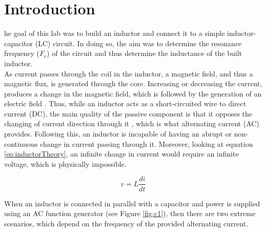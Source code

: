 \documentclass[journal]{IEEEtran}
\begin{document}




\section{Introduction}

\lowercase{he} goal of this lab was to build an inductor and connect it to a simple inductor-capacitor (LC) circuit. In doing so, the aim was to determine the resonance frequency ($F_{r}$) of the circuit and thus determine the inductance of the built inductor.\\

\noindent As current passes through the coil in the inductor, a magnetic field, and thus a magnetic flux, is generated through the core. Increasing or decreasing the current, produces a change in the magnetic field, which is followed by the generation of an electric field \cite{inductors}. Thus, while an inductor acts as a short-circuited wire to direct current (DC), the main quality of the passive component is that it opposes the changing of current direction through it \cite{hayt1986engineering}, which is what alternating current (AC) provides. Following this, an inductor is incapable of having an abrupt or non-continuous change in current passing through it. Moreover, looking at equation \ref{eq:inductorTheory}, an infinite change in current would require an infinite voltage, which is physically impossible.


\begin{equation}
v = L\frac{di}{dt}
\label{eq:inductorTheory}
\end{equation}


\noindent When an inductor is connected in parallel with a capacitor and power is supplied using an AC function generator (see Figure \ref{fig:c1}), then there are two extreme scenarios, which depend on the frequency of the provided alternating current.

\end{document}
